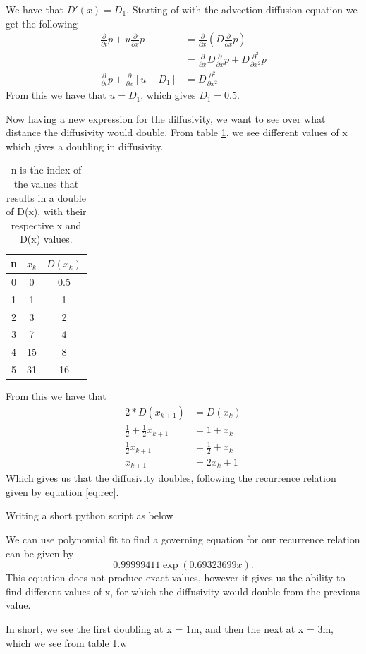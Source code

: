 \documentclass[10pt, a4paper]{amsart}
\begin{document}
We have that $D'(x) = D_1$. 
Starting of with the advection-diffusion equation we get the following 
\begin{align}
	\frac{\partial }{\partial t}p + u\frac{\partial}{\partial x} p &= \frac{\partial}{\partial x} \left(D\frac{\partial}{\partial x}p\right)\\
	&= \frac{\partial}{\partial x}D\frac{\partial}{\partial x} p + D\frac{\partial^2}{\partial x^2}p\\
	\frac{\partial}{\partial t}p + \frac{\partial}{\partial x}\left[u - D_1\right] &= D\frac{\partial^2}{\partial x^2}
\end{align}
From this we have that $u = D_1$, which gives $D_1 = 0.5$. 

Now having a new expression for the diffusivity, we want to see over what distance the diffusivity would double. From table \ref{table:1}, we see different values of x which gives a doubling in diffusivity. 
\begin{table}
	\centering
	\caption{n is the index of the values that results in a double of D(x), with their respective x and D(x) values.}
	\label{table:1}
	\begin{tabular}{|c|c|c|}
		\hline
		n &	$x_k$ & $D(x_k)$  \\ 
		\hline\hline
		0 & 0 & 0.5 \\  
		1 & 1 & 1 \\
		2 & 3 & 2 \\ 
		3 & 7 & 4 \\  
		4 & 15 & 8 \\ 
		5 & 31 & 16 \\
		\hline		
	\end{tabular}
\end{table}
From this we have that 
\begin{align}
	2*D(x_{k+1}) &= D(x_k)\\
	\frac{1}{2} + \frac{1}{2}x_{k+1} &= 1 + x_k\\
	\frac{1}{2}x_{k+1} &= \frac{1}{2}+x_k\\
	x_{k+1} &= 2x_k + 1\label{eq:rec}
\end{align}
Which gives us that the diffusivity doubles, following the recurrence relation given by equation \ref{eq:rec}. 

Writing a short python script as below


We can use polynomial fit to find a governing equation for our recurrence relation can be given by 
\begin{equation}
	0.99999411\exp(0.69323699x).
\end{equation}
This equation does not produce exact values, however it gives us the ability to find different values of x, for which the diffusivity would double from the previous value.

In short, we see the first doubling at x = 1m, and then the next at x = 3m, which we see from table \ref{table:1}.w


\end{document}
